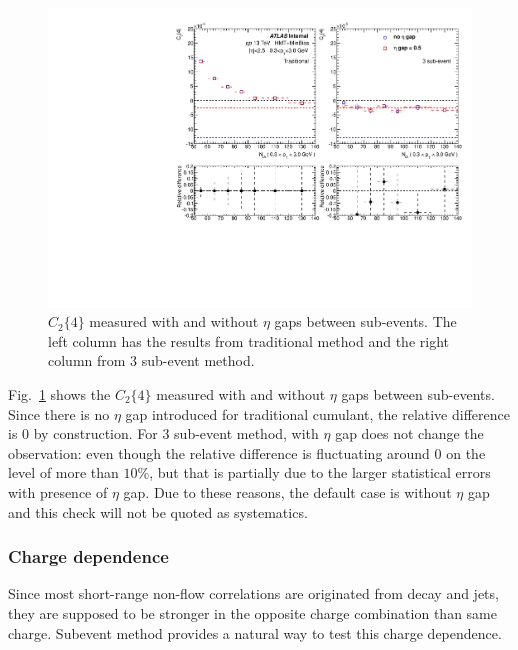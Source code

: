 \begin{figure}[H]
\centering
\includegraphics[width=0.8\linewidth]{figs/sec_sys/pp13/sys_pp13_gap.pdf}
\caption{$C_{2}\{4\}$ measured with and without $\eta$ gaps between sub-events. The left column has the results from traditional method and the right column from 3 sub-event method.}
\label{fig:sys_pp13_gap}
\end{figure}
Fig.~\ref{fig:sys_pp13_gap} shows the $C_{2}\{4\}$ measured with and without $\eta$ gaps between sub-events. Since there is no $\eta$ gap introduced for traditional cumulant, the relative difference is 0 by construction. For 3 sub-event method, with $\eta$ gap does not change the observation: even though the relative difference is fluctuating around 0 on the level of more than $10\%$, but that is partially due to the larger statistical errors with presence of $\eta$ gap. Due to these reasons, the default case is without $\eta$ gap and this check will not be quoted as systematics.



\subsubsection{Charge dependence}
Since most short-range non-flow correlations are originated from decay and jets, they are supposed to be stronger in the opposite charge combination than same charge. Subevent method provides a natural way to test this charge dependence.

